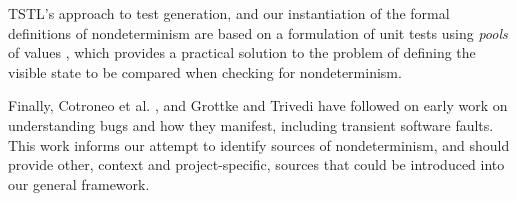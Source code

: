TSTL's approach to test generation, and our instantiation of the formal definitions of nondeterminism are based on a formulation of unit tests using \emph{pools} of values \cite{AndrewsTR}, which provides a practical solution to the problem of defining the visible state to be compared when checking for nondeterminism.

Finally, Cotroneo et al. \cite{CompBugs,FaultTriggers}, and Grottke and Trivedi \cite{GrottkeBugs} have followed on early work on understanding bugs and how they manifest, including transient \cite{Transient} software faults.  This work informs our attempt to identify sources of nondeterminism, and should provide other, context and project-specific, sources that could be introduced into our general framework.
